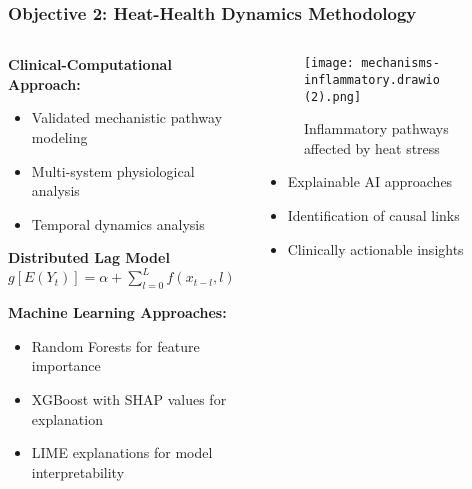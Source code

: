 \documentclass[aspectratio=169]{beamer}
\begin{document}
\begin{frame}
    \frametitle{Objective 2: Heat-Health Dynamics Methodology}
    
    \begin{columns}[T]
        \begin{column}{0.55\textwidth}
            \textbf{\large Clinical-Computational Approach:}
            \begin{itemize}[leftmargin=*, itemsep=6pt]
                \item Validated mechanistic pathway modeling
                \item Multi-system physiological analysis
                \item Temporal dynamics analysis
            \end{itemize}
            
            \textbf{Distributed Lag Model}
            $g[E(Y_t)] = \alpha + \sum_{l=0}^{L}f(x_{t-l}, l)$
            
            \textbf{\large Machine Learning Approaches:}
            \begin{itemize}[leftmargin=*, itemsep=6pt]
                \item Random Forests for feature importance
                \item XGBoost with SHAP values for explanation
                \item LIME explanations for model interpretability
            \end{itemize}
        \end{column}
        \begin{column}{0.42\textwidth}
            \begin{figure}
                \texttt{[image: mechanisms-inflammatory.drawio (2).png]}
                \caption{\small Inflammatory pathways affected by heat stress}
            \end{figure}
            
            \begin{impactbox}
                \begin{itemize}[leftmargin=*, itemsep=4pt]
                    \item Explainable AI approaches
                    \item Identification of causal links
                    \item Clinically actionable insights
                \end{itemize}
            \end{impactbox}
        \end{column}
    \end{columns}
\end{frame}
\end{document}

